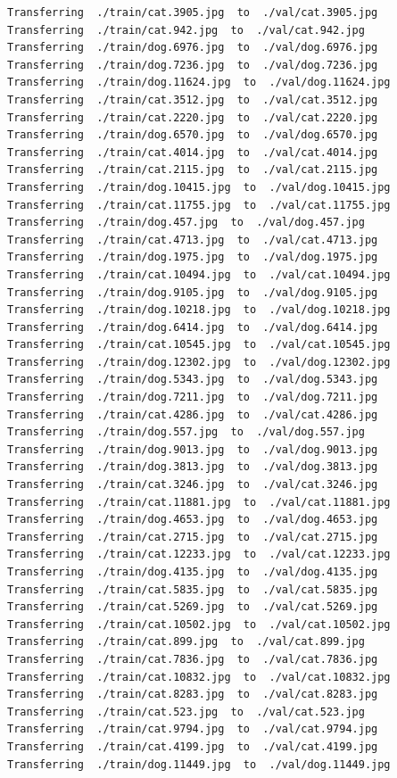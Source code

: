 \documentclass[]{book}
\theoremstyle{definition}
\theoremstyle{definition}
\theoremstyle{definition}
\theoremstyle{remark}
\begin{document}
\begin{verbatim}
Transferring  ./train/cat.3905.jpg  to  ./val/cat.3905.jpg
Transferring  ./train/cat.942.jpg  to  ./val/cat.942.jpg
Transferring  ./train/dog.6976.jpg  to  ./val/dog.6976.jpg
Transferring  ./train/dog.7236.jpg  to  ./val/dog.7236.jpg
Transferring  ./train/dog.11624.jpg  to  ./val/dog.11624.jpg
Transferring  ./train/cat.3512.jpg  to  ./val/cat.3512.jpg
Transferring  ./train/cat.2220.jpg  to  ./val/cat.2220.jpg
Transferring  ./train/dog.6570.jpg  to  ./val/dog.6570.jpg
Transferring  ./train/cat.4014.jpg  to  ./val/cat.4014.jpg
Transferring  ./train/cat.2115.jpg  to  ./val/cat.2115.jpg
Transferring  ./train/dog.10415.jpg  to  ./val/dog.10415.jpg
Transferring  ./train/cat.11755.jpg  to  ./val/cat.11755.jpg
Transferring  ./train/dog.457.jpg  to  ./val/dog.457.jpg
Transferring  ./train/cat.4713.jpg  to  ./val/cat.4713.jpg
Transferring  ./train/dog.1975.jpg  to  ./val/dog.1975.jpg
Transferring  ./train/cat.10494.jpg  to  ./val/cat.10494.jpg
Transferring  ./train/dog.9105.jpg  to  ./val/dog.9105.jpg
Transferring  ./train/dog.10218.jpg  to  ./val/dog.10218.jpg
Transferring  ./train/dog.6414.jpg  to  ./val/dog.6414.jpg
Transferring  ./train/cat.10545.jpg  to  ./val/cat.10545.jpg
Transferring  ./train/dog.12302.jpg  to  ./val/dog.12302.jpg
Transferring  ./train/dog.5343.jpg  to  ./val/dog.5343.jpg
Transferring  ./train/dog.7211.jpg  to  ./val/dog.7211.jpg
Transferring  ./train/cat.4286.jpg  to  ./val/cat.4286.jpg
Transferring  ./train/dog.557.jpg  to  ./val/dog.557.jpg
Transferring  ./train/dog.9013.jpg  to  ./val/dog.9013.jpg
Transferring  ./train/dog.3813.jpg  to  ./val/dog.3813.jpg
Transferring  ./train/cat.3246.jpg  to  ./val/cat.3246.jpg
Transferring  ./train/cat.11881.jpg  to  ./val/cat.11881.jpg
Transferring  ./train/dog.4653.jpg  to  ./val/dog.4653.jpg
Transferring  ./train/cat.2715.jpg  to  ./val/cat.2715.jpg
Transferring  ./train/cat.12233.jpg  to  ./val/cat.12233.jpg
Transferring  ./train/dog.4135.jpg  to  ./val/dog.4135.jpg
Transferring  ./train/cat.5835.jpg  to  ./val/cat.5835.jpg
Transferring  ./train/cat.5269.jpg  to  ./val/cat.5269.jpg
Transferring  ./train/cat.10502.jpg  to  ./val/cat.10502.jpg
Transferring  ./train/cat.899.jpg  to  ./val/cat.899.jpg
Transferring  ./train/cat.7836.jpg  to  ./val/cat.7836.jpg
Transferring  ./train/cat.10832.jpg  to  ./val/cat.10832.jpg
Transferring  ./train/cat.8283.jpg  to  ./val/cat.8283.jpg
Transferring  ./train/cat.523.jpg  to  ./val/cat.523.jpg
Transferring  ./train/cat.9794.jpg  to  ./val/cat.9794.jpg
Transferring  ./train/cat.4199.jpg  to  ./val/cat.4199.jpg
Transferring  ./train/dog.11449.jpg  to  ./val/dog.11449.jpg

\end{verbatim}
\end{document}
